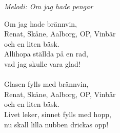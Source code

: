 {\footnotesize\textit{Melodi: Om jag hade pengar}}\par
\vspace{10pt}
Om jag hade brännvin,\\
Renat, Skåne, Aalborg, OP, Vinbär \\
och en liten bäsk.\\
Allihopa ställda på en rad,\\
vad jag skulle vara glad! \\
\\
Glasen fylls med brännvin,\\
Renat, Skåne, Aalborg, OP, Vinbär\\
och en liten bäsk.\\
Livet leker, sinnet fylls med hopp,\\
nu skall lilla nubben drickas opp!
